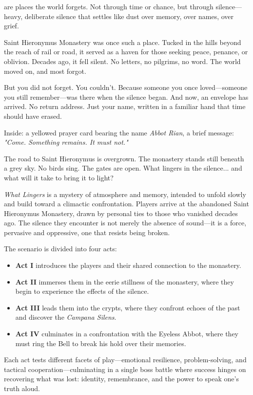 
\begin{WyrdSettingHeading}
     are places the world forgets. Not through time or chance, but through silence—heavy, deliberate silence that settles like dust over memory, over names, over grief.

    \noindent
    Saint Hieronymus Monastery was once such a place. Tucked in the hills beyond the reach of rail or road, it served as a haven for those seeking peace, penance, or oblivion. Decades ago, it fell silent. No letters, no pilgrims, no word. The world moved on, and most forgot.

    But you did not forget. You couldn’t. Because someone you once loved—someone you still remember—was there when the silence began. And now, an envelope has arrived. No return address. Just your name, written in a familiar hand that time should have erased.

    Inside: a yellowed prayer card bearing the name \emph{Abbot Rian}, a brief message: \textit{"Come. Something remains. It must not."}

    The road to Saint Hieronymus is overgrown. The monastery stands still beneath a grey sky. No birds sing. The gates are open. What lingers in the silence... and what will it take to bring it to light?
\end{WyrdSettingHeading}

\emph{What Lingers} is a mystery of atmosphere and memory, intended to unfold slowly and build toward a climactic confrontation. Players arrive at the abandoned Saint Hieronymus Monastery, drawn by personal ties to those who vanished decades ago. The silence they encounter is not merely the absence of sound—it is a force, pervasive and oppressive, one that resists being broken.

The scenario is divided into four acts: 
\begin{itemize}
    \item \textbf{Act I} introduces the players and their shared connection to the monastery.
    \item \textbf{Act II} immerses them in the eerie stillness of the monastery, where they begin to experience the effects of the silence.
    \item \textbf{Act III} leads them into the crypts, where they confront echoes of the past and discover the \emph{Campana Silens}.
    \item \textbf{Act IV} culminates in a confrontation with the Eyeless Abbot, where they must ring the Bell to break his hold over their memories.
\end{itemize}
Each act tests different facets of play—emotional resilience, problem-solving, and tactical cooperation—culminating in a single boss battle where success hinges on recovering what was lost: identity, remembrance, and the power to speak one’s truth aloud.


